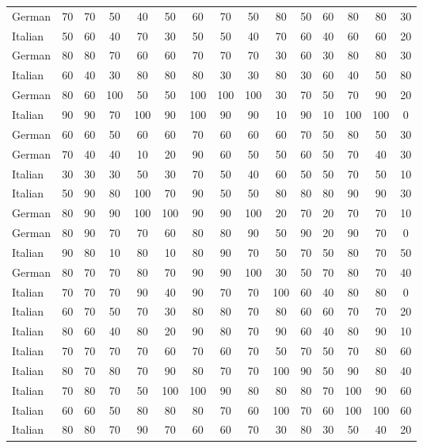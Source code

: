 \begin{table}[htbp]
\begin{tabular}{lcccccccccccccc}
\midrule
German & 70 & 70 & 50 & 40 & 50 & 60 & 70 & 50 & 80 & 50 & 60 & 80 & 80 & 30 \\
Italian & 50 & 60 & 40 & 70 & 30 & 50 & 50 & 40 & 70 & 60 & 40 & 60 & 60 & 20 \\
German & 80 & 80 & 70 & 60 & 60 & 70 & 70 & 70 & 30 & 60 & 30 & 80 & 80 & 30 \\
Italian & 60 & 40 & 30 & 80 & 80 & 80 & 30 & 30 & 80 & 30 & 60 & 40 & 50 & 80 \\
German & 80 & 60 & 100 & 50 & 50 & 100 & 100 & 100 & 30 & 70 & 50 & 70 & 90 & 20 \\
Italian & 90 & 90 & 70 & 100 & 90 & 100 & 90 & 90 & 10 & 90 & 10 & 100 & 100 & 0 \\
German & 60 & 60 & 50 & 60 & 60 & 70 & 60 & 60 & 60 & 70 & 50 & 80 & 50 & 30 \\
German & 70 & 40 & 40 & 10 & 20 & 90 & 60 & 50 & 50 & 60 & 50 & 70 & 40 & 30 \\
Italian & 30 & 30 & 30 & 50 & 30 & 70 & 50 & 40 & 60 & 50 & 50 & 70 & 50 & 10 \\
Italian & 50 & 90 & 80 & 100 & 70 & 90 & 50 & 50 & 80 & 80 & 80 & 90 & 90 & 30 \\
German & 80 & 90 & 90 & 100 & 100 & 90 & 90 & 100 & 20 & 70 & 20 & 70 & 70 & 10 \\
German & 80 & 90 & 70 & 70 & 60 & 80 & 80 & 90 & 50 & 90 & 20 & 90 & 70 & 0 \\
Italian & 90 & 80 & 10 & 80 & 10 & 80 & 90 & 70 & 50 & 70 & 50 & 80 & 70 & 50 \\
German & 80 & 70 & 70 & 80 & 70 & 90 & 90 & 100 & 30 & 50 & 70 & 80 & 70 & 40 \\
Italian & 70 & 70 & 70 & 90 & 40 & 90 & 70 & 70 & 100 & 60 & 40 & 80 & 80 & 0 \\
Italian & 60 & 70 & 50 & 70 & 30 & 80 & 80 & 70 & 80 & 60 & 60 & 70 & 70 & 20 \\
Italian & 80 & 60 & 40 & 80 & 20 & 90 & 80 & 70 & 90 & 60 & 40 & 80 & 90 & 10 \\
Italian & 70 & 70 & 70 & 70 & 60 & 70 & 60 & 70 & 50 & 70 & 50 & 70 & 80 & 60 \\
Italian & 80 & 70 & 80 & 70 & 90 & 80 & 70 & 70 & 100 & 90 & 50 & 90 & 80 & 40 \\
Italian & 70 & 80 & 70 & 50 & 100 & 100 & 90 & 80 & 80 & 80 & 70 & 100 & 90 & 60 \\
Italian & 60 & 60 & 50 & 80 & 80 & 80 & 70 & 60 & 100 & 70 & 60 & 100 & 100 & 60 \\
Italian & 80 & 80 & 70 & 90 & 70 & 60 & 60 & 70 & 30 & 80 & 30 & 50 & 40 & 20 \\

\end{tabular}
\end{table}
